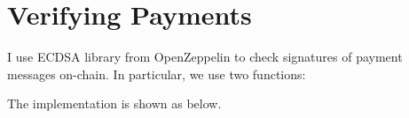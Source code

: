 \section{Verifying Payments}\label{sec:verifying-payments}
I use ECDSA library from OpenZeppelin to check signatures of payment messages on-chain.
In particular, we use two functions:

The implementation is shown as below.
